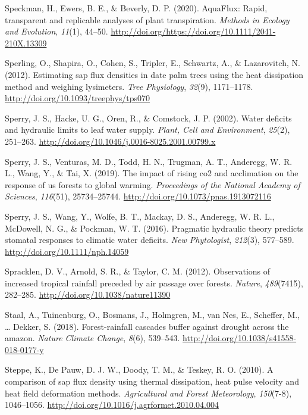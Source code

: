 \documentclass[11pt,twoside]{reedthesis}
\begin{document}
\hypertarget{ref-Speckman2020}{}
Speckman, H., Ewers, B. E., \& Beverly, D. P. (2020). AquaFlux: Rapid,
transparent and replicable analyses of plant transpiration.
\emph{Methods in Ecology and Evolution}, \emph{11}(1), 44--50.
\url{http://doi.org/https://doi.org/10.1111/2041-210X.13309}

\hypertarget{ref-Sperling2012}{}
Sperling, O., Shapira, O., Cohen, S., Tripler, E., Schwartz, A., \&
Lazarovitch, N. (2012). Estimating sap flux densities in date palm trees
using the heat dissipation method and weighing lysimeters. \emph{Tree
Physiology}, \emph{32}(9), 1171--1178.
\url{http://doi.org/10.1093/treephys/tps070}

\hypertarget{ref-sperry_water_2002}{}
Sperry, J. S., Hacke, U. G., Oren, R., \& Comstock, J. P. (2002). Water
deficits and hydraulic limits to leaf water supply. \emph{Plant, Cell
and Environment}, \emph{25}(2), 251--263.
\url{http://doi.org/10.1046/j.0016-8025.2001.00799.x}

\hypertarget{ref-Sperry2019}{}
Sperry, J. S., Venturas, M. D., Todd, H. N., Trugman, A. T., Anderegg,
W. R. L., Wang, Y., \& Tai, X. (2019). The impact of rising co2 and
acclimation on the response of us forests to global warming.
\emph{Proceedings of the National Academy of Sciences}, \emph{116}(51),
25734--25744. \url{http://doi.org/10.1073/pnas.1913072116}

\hypertarget{ref-sperry_pragmatic_2016}{}
Sperry, J. S., Wang, Y., Wolfe, B. T., Mackay, D. S., Anderegg, W. R.
L., McDowell, N. G., \& Pockman, W. T. (2016). Pragmatic hydraulic
theory predicts stomatal responses to climatic water deficits. \emph{New
Phytologist}, \emph{212}(3), 577--589.
\url{http://doi.org/10.1111/nph.14059}

\hypertarget{ref-Spracklen2012}{}
Spracklen, D. V., Arnold, S. R., \& Taylor, C. M. (2012). Observations
of increased tropical rainfall preceded by air passage over forests.
\emph{Nature}, \emph{489}(7415), 282--285.
\url{http://doi.org/10.1038/nature11390}

\hypertarget{ref-Staal2018}{}
Staal, A., Tuinenburg, O., Bosmans, J., Holmgren, M., van Nes, E.,
Scheffer, M., \ldots{} Dekker, S. (2018). Forest-rainfall cascades
buffer against drought across the amazon. \emph{Nature Climate Change},
\emph{8}(6), 539--543. \url{http://doi.org/10.1038/s41558-018-0177-y}

\hypertarget{ref-Steppe2010}{}
Steppe, K., De Pauw, D. J. W., Doody, T. M., \& Teskey, R. O. (2010). A
comparison of sap flux density using thermal dissipation, heat pulse
velocity and heat field deformation methods. \emph{Agricultural and
Forest Meteorology}, \emph{150}(7-8), 1046--1056.
\url{http://doi.org/10.1016/j.agrformet.2010.04.004}
\end{document}
